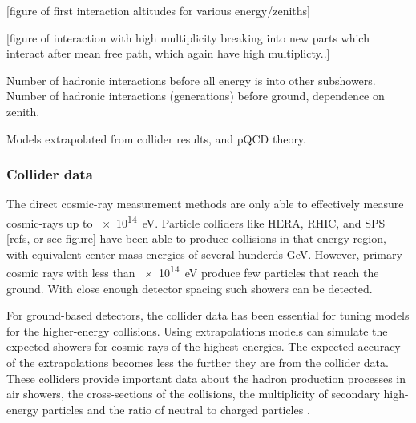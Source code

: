 [figure of first interaction altitudes for various energy/zeniths]

[figure of interaction with high multiplicity breaking into new parts which interact after mean free path, which again have high multiplicty..]

Number of hadronic interactions before all energy is into other subshowers. Number of hadronic interactions (generations) before ground, dependence on zenith.

\cite{pierog2015hadronic}

Models extrapolated from collider results, and pQCD theory.



\subsubsection{Collider data}

The direct cosmic-ray measurement methods are only able to effectively measure cosmic-rays up to \SI{e14}{\eV}. Particle colliders like HERA, RHIC, and SPS [refs, or see figure] have been able to produce collisions in that energy region, with equivalent center mass energies of several hunderds \si{\GeV}. However, primary cosmic rays with less than \SI{e14}{\eV} produce few particles that reach the ground. With close enough detector spacing such showers can be detected.

For ground-based detectors, the collider data has been essential for tuning models for the higher-energy collisions. Using extrapolations models can simulate the expected showers for cosmic-rays of the highest energies. The expected accuracy of the extrapolations becomes less the further they are from the collider data. These colliders provide important data about the hadron production processes in air showers, the cross-sections of the collisions, the multiplicity of secondary high-energy particles and the ratio of neutral to charged particles \cite{pierog2008lhc}.

